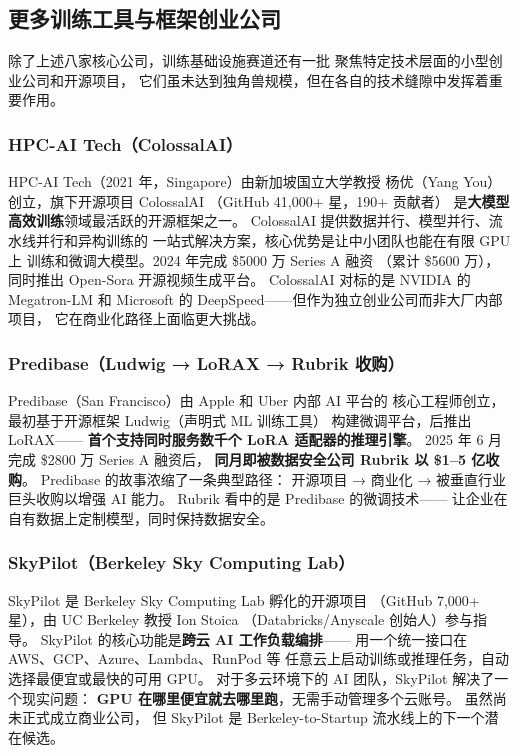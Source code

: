 \subsection{更多训练工具与框架创业公司}
\label{subsec:training-more}

除了上述八家核心公司，训练基础设施赛道还有一批
聚焦特定技术层面的小型创业公司和开源项目，
它们虽未达到独角兽规模，但在各自的技术缝隙中发挥着重要作用。

\subsubsection{HPC-AI Tech（ColossalAI）}
HPC-AI Tech（2021 年，Singapore）由新加坡国立大学教授
杨优（Yang You）创立，旗下开源项目 ColossalAI
（GitHub 41,000+ 星，190+ 贡献者）
是\textbf{大模型高效训练}领域最活跃的开源框架之一。
ColossalAI 提供数据并行、模型并行、流水线并行和异构训练的
一站式解决方案，核心优势是让中小团队也能在有限 GPU 上
训练和微调大模型。2024 年完成 \$5000 万 Series A 融资
（累计 \$5600 万），同时推出 Open-Sora 开源视频生成平台。
ColossalAI 对标的是 NVIDIA 的 Megatron-LM 和 Microsoft 的
DeepSpeed——但作为独立创业公司而非大厂内部项目，
它在商业化路径上面临更大挑战。

\subsubsection{Predibase（Ludwig → LoRAX → Rubrik 收购）}
Predibase（San Francisco）由 Apple 和 Uber 内部 AI 平台的
核心工程师创立，最初基于开源框架 Ludwig（声明式 ML 训练工具）
构建微调平台，后推出 LoRAX——
\textbf{首个支持同时服务数千个 LoRA 适配器的推理引擎}。
2025 年 6 月完成 \$2800 万 Series A 融资后，
\textbf{同月即被数据安全公司 Rubrik 以 \$1--5 亿收购}。
Predibase 的故事浓缩了一条典型路径：
开源项目 → 商业化 → 被垂直行业巨头收购以增强 AI 能力。
Rubrik 看中的是 Predibase 的微调技术——
让企业在自有数据上定制模型，同时保持数据安全。

\subsubsection{SkyPilot（Berkeley Sky Computing Lab）}
SkyPilot 是 Berkeley Sky Computing Lab 孵化的开源项目
（GitHub 7,000+ 星），由 UC Berkeley 教授 Ion Stoica
（Databricks/Anyscale 创始人）参与指导。
SkyPilot 的核心功能是\textbf{跨云 AI 工作负载编排}——
用一个统一接口在 AWS、GCP、Azure、Lambda、RunPod 等
任意云上启动训练或推理任务，自动选择最便宜或最快的可用 GPU。
对于多云环境下的 AI 团队，SkyPilot 解决了一个现实问题：
\textbf{GPU 在哪里便宜就去哪里跑}，无需手动管理多个云账号。
虽然尚未正式成立商业公司，
但 SkyPilot 是 Berkeley-to-Startup 流水线上的下一个潜在候选。
